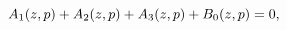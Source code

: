 \[\mathop{A_{1}\/}\nolimits\!\left(z,p\right)+\mathop{A_{2}\/}\nolimits\!\left(z%
,p\right)+\mathop{A_{3}\/}\nolimits\!\left(z,p\right)+\mathop{B_{0}\/}%
\nolimits\!\left(z,p\right)=0,\]